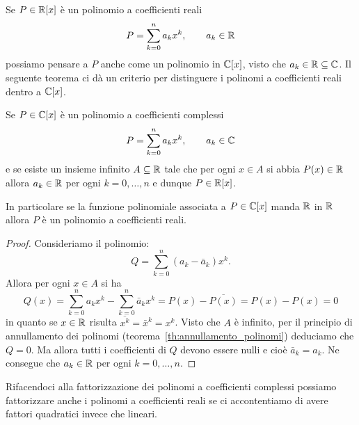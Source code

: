 Se $P\in \mathbb R[x]$ è un polinomio a coefficienti reali
\[
  P = \sum_{k=0}^n a_k x^k, \qquad a_k\in \mathbb R
\]
possiamo pensare a $P$ anche come un polinomio in
$\mathbb C[x]$, visto che $a_k\in \mathbb R\subseteq \mathbb C$.
Il seguente teorema ci dà un criterio per distinguere
i polinomi a coefficienti reali dentro a $\mathbb C[x]$.

\begin{theorem}
\label{th:caratterizzazione_polinomi_reali}%
Se $P\in \mathbb C[x]$ è un polinomio a coefficienti complessi
\[
  P = \sum_{k=0}^n a_k x^k,\qquad a_k\in \mathbb C
\]
e se esiste un insieme infinito $A\subseteq \mathbb R$
tale che per ogni $x\in A$ si abbia $P(x)\in \mathbb R$
allora $a_k\in\mathbb R$ per ogni $k=0,\dots,n$ e dunque $P\in \mathbb R[x]$.

In particolare se la funzione polinomiale associata a
$P\in\mathbb C[x]$ manda $\mathbb R$ in $\mathbb R$ allora $P$ è un polinomio
a coefficienti reali.
\end{theorem}
%
\begin{proof}
Consideriamo il polinomio:
\[
  Q = \sum_{k=0}^n (a_k-\bar a_k) x^k.
\]
Allora per ogni $x\in A$ si ha
\[
  Q(x) = \sum_{k=0}^n a_k x^k - \sum_{k=0}^n \bar a_k x^k
     = P(x) - \overline{P(x)} = P(x) - P(x) = 0
\]
in quanto se $x\in \mathbb R$ risulta
$\overline{x^k} = {\bar x}^k = x^k$.
Visto che $A$ è infinito,
per il principio di annullamento dei polinomi
(teorema~\ref{th:annullamento_polinomi})
deduciamo che $Q=0$.
Ma allora tutti i coefficienti di $Q$ devono
essere nulli e cioè $\bar a_k = a_k$.
Ne consegue che $a_k\in \mathbb R$ per ogni $k=0,\dots,n$.
\end{proof}

Rifacendoci alla fattorizzazione dei polinomi a coefficienti
complessi possiamo fattorizzare anche i polinomi a coefficienti
reali se ci accontentiamo di avere fattori quadratici
invece che lineari.

